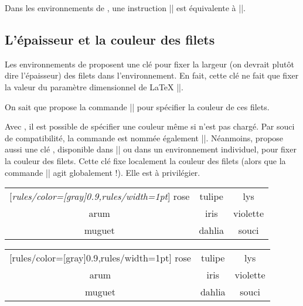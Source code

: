 \documentclass[dvipsnames]{article}%
\begin{document}
\medskip
Dans les environnements de , une instruction
|| est équivalente à
||.

\subsection{L'épaisseur et la couleur des filets}


Les environnements de  proposent une clé
 pour fixer la largeur (on devrait plutôt dire
l'épaisseur) des filets dans l'environnement. En fait, cette clé ne fait que
fixer la valeur du paramètre dimensionnel de LaTeX |\arrayrulewidth|.

\smallskip
On sait que  propose la commande |\arrayrulecolor| pour spécifier
la couleur de ces filets.

\smallskip
{} 
Avec , il est possible de spécifier une couleur même si
 n'est pas chargé. Par souci de compatibilité, la commande est
nommée également |\arrayrulecolor|. Néanmoins,  propose aussi
une clé , disponible dans |\NiceMatrixOptions| ou dans un
environnement individuel, pour fixer la couleur des filets. Cette clé fixe
localement la couleur des filets (alors que la commande |\arrayrulecolor| agit
globalement !). Elle est à privilégier.

\medskip
\begin{Code}[width=15cm]
\begin{NiceTabular}{|ccc|}[\emph{rules/color=[gray]{0.9},rules/width=1pt}]
\hline
rose & tulipe & lys \\
arum & iris & violette \\
muguet & dahlia & souci \\
\hline
\end{NiceTabular}
\end{Code}
\hspace{-5cm}
\begin{NiceTabular}{|ccc|}[rules/color=[gray]{0.9},rules/width=1pt]
\hline
rose & tulipe & lys \\
arum & iris & violette \\
muguet & dahlia & souci \\
\hline
\end{NiceTabular}
\end{document}
